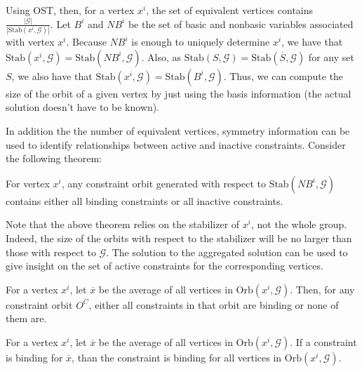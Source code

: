 \documentclass[runningheads]{llncs}
\newcommand{\cG}{{\mathcal G}}
\begin{document}
Using OST, then, for a vertex $x^i$, the set of equivalent vertices contains
$\frac{ |\cG|}{|\mbox{Stab}(x^i,\cG)|}$. Let $B^i$ and $NB^i$ be the set of
basic and nonbasic variables associated with vertex $x^i$. Because $NB^i$ is
enough to uniquely determine $x^i$, we have that $\mbox{Stab}(x^i,\cG) =
\mbox{Stab}(NB^i,\cG)$. Also, as $\mbox{Stab}(S,\cG) =
\mbox{Stab}(\overline{S},\cG)$ for any set $S$, we also have that $\mbox{Stab}(x^i,\cG) =
\mbox{Stab}(B^i,\cG)$. Thus, we can compute the size of the orbit of a given
vertex by just using the basis information (the actual solution doesn't have to
be known). 

In addition the the number of equivalent vertices, symmetry information can be
used to identify relationships between active and inactive constraints. Consider
the following theorem:

\begin{theorem}
For vertex $x^i$, any constraint orbit generated with respect to
$\mbox{Stab}(NB^i,\cG)$ contains either all binding constraints or all inactive constraints. 
\end{theorem}

Note that the above theorem relies on the stabilizer of $x^i$, not the whole
group. Indeed, the size of the orbits with respect to the stabilizer will be no larger than
those with respect to $\cG$. The solution to the aggregated solution can be used
to give insight on the set of active constraints for the corresponding vertices.


\begin{theorem}
For a vertex $x^i$, let $\overline{x}$ be the average of all vertices in
$\mbox{Orb}(x^i, \cG)$. Then, for any constraint orbit $O^C$, either all
constraints in that orbit are binding or none of them are. 
  \end{theorem}

\begin{corollary}
For a vertex $x^i$, let $\overline{x}$ be the average of all vertices in
$\mbox{Orb}(x^i, \cG)$. If a constraint is binding for $\overline{x}$, than the
constraint is binding for all vertices in $\mbox{Orb}(x^i, \cG)$.
  \end{corollary}
\end{document}
